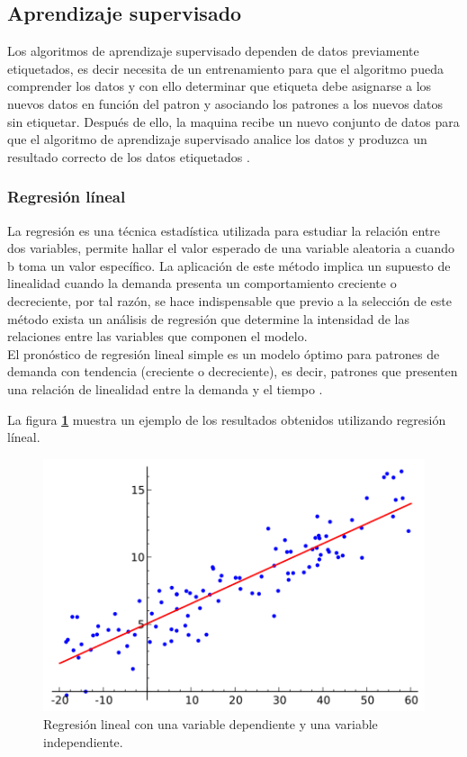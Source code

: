 \subsection{Aprendizaje supervisado}
Los algoritmos de aprendizaje supervisado dependen de datos previamente etiquetados, es decir necesita de un entrenamiento para 
que el algoritmo pueda comprender los datos y con ello determinar que etiqueta debe asignarse a los nuevos datos 
en función del patron y asociando los patrones a los nuevos datos sin etiquetar. Después de ello, la maquina recibe 
un nuevo conjunto de datos para que el algoritmo de aprendizaje supervisado analice los datos y produzca un resultado 
correcto de los datos etiquetados \citep{CT4}.

\subsubsection{Regresión líneal}
La regresión es una técnica estadística utilizada para estudiar la relación entre dos variables, permite hallar el valor esperado de 
una variable aleatoria a cuando b toma un valor específico. La aplicación de este método implica un supuesto de linealidad cuando 
la demanda presenta un comportamiento creciente o decreciente, por tal razón, se hace indispensable que previo a la selección de 
este método exista un análisis de regresión que determine la intensidad de las relaciones entre las variables que componen el modelo.
\\
El pronóstico de regresión lineal simple es un modelo óptimo para patrones de demanda con tendencia (creciente o decreciente), 
es decir, patrones que presenten una relación de linealidad entre la demanda y el tiempo \citep{CT5}.

La figura \textbf{\ref{fig:RL}} muestra un ejemplo de los resultados obtenidos utilizando regresión líneal. 

\begin{figure}[H]
  \centering
  \includegraphics[scale=.6]{imagenes/Capitulo3/regresionLineal}
  \caption{Regresión lineal con una variable dependiente y una variable independiente.}
  \label{fig:RL}
\end{figure}

